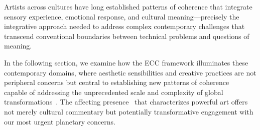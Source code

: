 Artists across cultures have long established patterns of coherence that integrate sensory experience, emotional response, and cultural meaning—precisely the integrative approach needed to address complex contemporary challenges that transcend conventional boundaries between technical problems and questions of meaning.

In the following section, we examine how the ECC framework illuminates these contemporary domains, where aesthetic sensibilities and creative practices are not peripheral concerns but central to establishing new patterns of coherence~ capable of addressing the unprecedented scale and complexity of global transformations~\cite{rappaport1999ritual,dissanayake1992homo}. The affecting presence~ that characterizes powerful art offers not merely cultural commentary but potentially transformative engagement with our most urgent planetary concerns.

